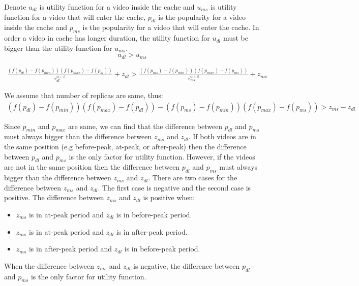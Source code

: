 Denote $u_{dl}$ is utility function for a video inside the cache and $u_{ms}$ is utility function for a video that will enter the cache,  $p_{dl}$ is the popularity for a video inside the cache and $p_{ms}$ is the popularity for a video that will enter the cache.
In order a video in cache has longer duration, the utility function for $u_{dl}$ must be bigger than the utility function for $u_{ms}$.
\begin{equation*}
u_{dl} > u_{ms}
\end{equation*}

\begin{align*}
\frac{ (f(p_{dl}) - f(p_{min})) (f(p_{max}) - f(p_{dl})) }{r^{\alpha + \beta}_{dl}} + z_{dl} > 
\frac{ (f(p_{ms}) - f(p_{min})) (f(p_{max}) - f(p_{ms})) }{r^{\alpha + \beta}_{ms}} + z_{ms}
\end{align*}

We assume that number of replicas are same, thus:
\begin{align*}
(f(p_{dl}) - f(p_{min})) (f(p_{max}) - f(p_{dl})) -  
(f(p_{ms}) - f(p_{min})) (f(p_{max}) - f(p_{ms})) > 
z_{ms} - z_{dl}
\end{align*}

Since $p_{min}$ and $p_{max}$ are same, we can find that the difference between $p_{dl}$ and $p_{ms}$ must always bigger than the difference between $z_{ms}$ and $z_{dl}$.
If both videos are in the same position (e.g before-peak, at-peak, or after-peak) then the difference between $p_{dl}$ and $p_{ms}$ is the only factor for utility function.
However, if the videos are not in the same position then the difference between $p_{dl}$ and $p_{ms}$ must always bigger than the difference between $z_{ms}$ and $z_{dl}$.
There are two cases for the difference between $z_{ms}$ and $z_{dl}$.
The first case is negative and the second case is positive.    
The difference between $z_{ms}$ and $z_{dl}$ is positive when: 
\begin{itemize}
\item $z_{ms}$ is in at-peak period and $z_{dl}$ is in before-peak period.
\item $z_{ms}$ is in at-peak period and $z_{dl}$ is in after-peak period.
\item $z_{ms}$ is in after-peak period and $z_{dl}$ is in before-peak period.
\end{itemize}
When the difference between $z_{ms}$ and $z_{dl}$ is negative, the difference between $p_{dl}$ and $p_{ms}$ is the only factor for utility function.



